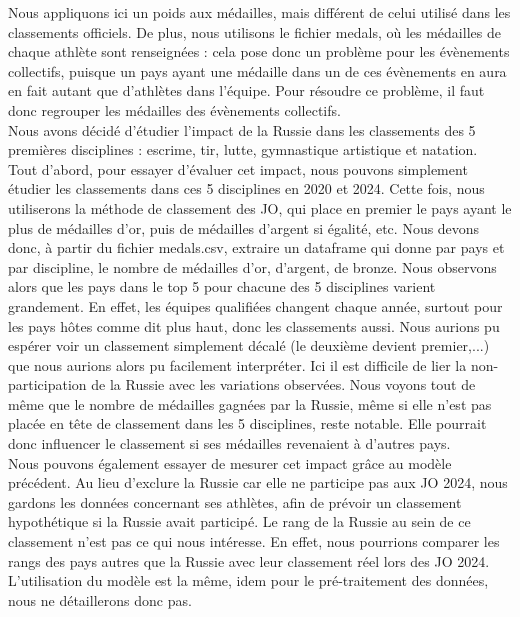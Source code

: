 \documentclass{article}
\begin{document}
Nous appliquons ici un poids aux médailles, mais différent de celui utilisé dans les classements officiels. De plus, nous utilisons le fichier medals, où les médailles de chaque athlète sont renseignées : cela pose donc un problème pour les évènements collectifs, puisque un pays ayant une médaille dans un de ces évènements en aura en fait autant que d'athlètes dans l'équipe. Pour résoudre ce problème, il faut donc regrouper les médailles des évènements collectifs.
\\\indent Nous avons décidé d'étudier l'impact de la Russie dans les classements des 5 premières disciplines : escrime, tir, lutte, gymnastique artistique et natation.
\\\indent Tout d'abord, pour essayer d'évaluer cet impact, nous pouvons simplement étudier les classements dans ces 5 disciplines en 2020 et 2024. Cette fois, nous utiliserons la méthode de classement des JO, qui place en premier le pays ayant le plus de médailles d'or, puis de médailles d'argent si égalité, etc. Nous devons donc, à partir du fichier medals.csv, extraire un dataframe qui donne par pays et par discipline, le nombre de médailles d'or, d'argent, de bronze. Nous observons alors que les pays dans le top 5 pour chacune des 5 disciplines varient grandement. En effet, les équipes qualifiées changent chaque année, surtout pour les pays hôtes comme dit plus haut, donc les classements aussi. Nous aurions pu espérer voir un classement simplement décalé (le deuxième devient premier,...) que nous aurions alors pu facilement interpréter. Ici il est difficile de lier la non-participation de la Russie avec les variations observées. Nous voyons tout de même que le nombre de médailles gagnées par la Russie, même si elle n'est pas placée en tête de classement dans les 5 disciplines, reste notable. Elle pourrait donc influencer le classement si ses médailles revenaient à d'autres pays.
\\\indent Nous pouvons également essayer de mesurer cet impact grâce au modèle précédent. Au lieu d'exclure la Russie car elle ne participe pas aux JO 2024, nous gardons les données concernant ses athlètes, afin de prévoir un classement hypothétique si la Russie avait participé. Le rang de la Russie au sein de ce classement n'est pas ce qui nous intéresse. En effet, nous pourrions comparer les rangs des pays autres que la Russie avec leur classement réel lors des JO 2024. L'utilisation du modèle est la même, idem pour le pré-traitement des données, nous ne détaillerons donc pas. 
\\
\end{document}
